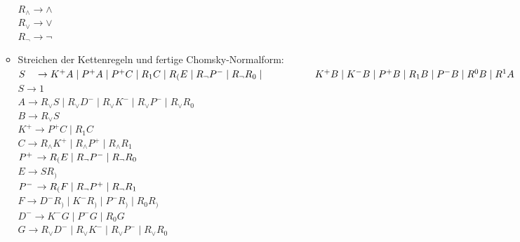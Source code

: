 \documentclass[11pt]{article}
\begin{document}
\begin{enumerate}
\begin{itemize}
\\\hspace*{6mm} $R_{\wedge} \rightarrow \wedge$
\\\hspace*{6mm} $R_{\vee} \rightarrow \vee$
\\\hspace*{6mm} $R_{\neg} \rightarrow \neg$
\item \hspace*{6mm} Streichen der Kettenregeln und fertige Chomsky-Normalform:
\\\hspace*{6mm} $S \hspace{3,5mm}\rightarrow K^{+} A\mid P^{+}A \mid P^{+}C \mid R_{1}C \mid R_{(}E \mid R_{\neg}P^{-} \mid  R_{\neg}R_{0} \mid \hspace*{18mm}K^{+}B \mid K^{-}B \mid P^{+}B \mid R_{1}B \mid P^{-}B \mid R^{0}B \mid R^{1}A$
\\\hspace*{6mm} $S \rightarrow 1$
\\\hspace*{6mm} $A \rightarrow R_{\vee}S \mid R_{\vee}D^{-} \mid R_{\vee}K^{-} \mid R_{\vee}P^{-} \mid R_{\vee}R_{0}$
\\\hspace*{6mm} $B \rightarrow R_{\vee}S$
\\\hspace*{6mm} $K^{+} \rightarrow P^{+}C \mid R_{1}C$
\\\hspace*{6mm} $C \rightarrow R_{\wedge}K^{+} \mid R_{\wedge}P^{+} \mid R_{\wedge}R_{1}$
\\\hspace*{6mm} $P^{+} \hspace{0,5mm}\rightarrow R_{(}E\mid R_{\neg} P^{-} \mid R_{\neg}R_{0}$
\\\hspace*{6mm} $E \rightarrow SR_{)}$
\\\hspace*{6mm} $P^{-} \hspace{0,5mm}\rightarrow R_{(}F\mid R_{\neg}P^{+} \mid R_{\neg}R_{1}$
\\\hspace*{6mm} $F \rightarrow D^{-}R_{)} \mid K^{-}R_{)} \mid P^{-}R_{)} \mid R_{0}R_{)}$
\\\hspace*{6mm} $D^{-} \rightarrow K^{-}G \mid P^{-}G \mid R_{0}G$
\\\hspace*{6mm} $G \rightarrow R_{\vee}D^{-} \mid R_{\vee}K^{-} \mid R_{\vee}P^{-} \mid R_{\vee}R_{0}$

\end{itemize}
\end{enumerate}
\end{document}
